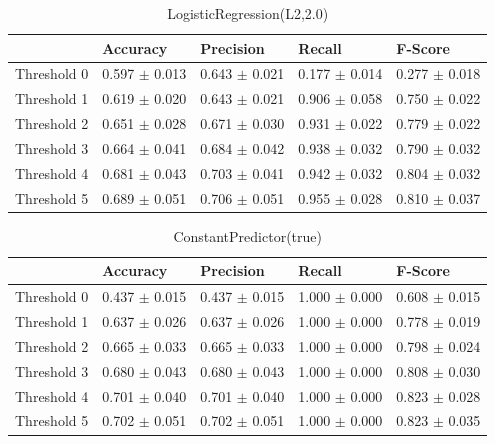 \begin{table}[h]
	\centering
	\begin{tabular}{|l|l|l|l|l|} %
	\hline
	& Accuracy & Precision & Recall & F-Score \\ \hline
	Threshold 0 & 0.597	\( \pm \) 0.013	& 0.643	\( \pm \) 0.021	& 0.177	\( \pm \) 0.014	& 0.277	\( \pm \) 0.018	\\ \hline
	Threshold 1 & 0.619	\( \pm \) 0.020	& 0.643	\( \pm \) 0.021	& 0.906	\( \pm \) 0.058	& 0.750	\( \pm \) 0.022	\\ \hline
	Threshold 2 & 0.651	\( \pm \) 0.028	& 0.671	\( \pm \) 0.030	& 0.931	\( \pm \) 0.022	& 0.779	\( \pm \) 0.022	\\ \hline
	Threshold 3 & 0.664	\( \pm \) 0.041	& 0.684	\( \pm \) 0.042	& 0.938	\( \pm \) 0.032	& 0.790	\( \pm \) 0.032	\\ \hline
	Threshold 4 & 0.681	\( \pm \) 0.043	& 0.703	\( \pm \) 0.041	& 0.942	\( \pm \) 0.032	& 0.804	\( \pm \) 0.032	\\ \hline
	Threshold 5 & 0.689	\( \pm \) 0.051	& 0.706	\( \pm \) 0.051	& 0.955	\( \pm \) 0.028	& 0.810	\( \pm \) 0.037	\\ \hline
	\end{tabular}
	\caption{LogisticRegression(L2,2.0)}
	\label{tab:revpol}
\end{table}
\clearpage
\begin{table}[h]
	\centering
	\begin{tabular}{|l|l|l|l|l|} %
	\hline
	& Accuracy & Precision & Recall & F-Score \\ \hline
	Threshold 0 & 0.437	\( \pm \) 0.015	& 0.437	\( \pm \) 0.015	& 1.000	\( \pm \) 0.000	& 0.608	\( \pm \) 0.015	\\ \hline
	Threshold 1 & 0.637	\( \pm \) 0.026	& 0.637	\( \pm \) 0.026	& 1.000	\( \pm \) 0.000	& 0.778	\( \pm \) 0.019	\\ \hline
	Threshold 2 & 0.665	\( \pm \) 0.033	& 0.665	\( \pm \) 0.033	& 1.000	\( \pm \) 0.000	& 0.798	\( \pm \) 0.024	\\ \hline
	Threshold 3 & 0.680	\( \pm \) 0.043	& 0.680	\( \pm \) 0.043	& 1.000	\( \pm \) 0.000	& 0.808	\( \pm \) 0.030	\\ \hline
	Threshold 4 & 0.701	\( \pm \) 0.040	& 0.701	\( \pm \) 0.040	& 1.000	\( \pm \) 0.000	& 0.823	\( \pm \) 0.028	\\ \hline
	Threshold 5 & 0.702	\( \pm \) 0.051	& 0.702	\( \pm \) 0.051	& 1.000	\( \pm \) 0.000	& 0.823	\( \pm \) 0.035	\\ \hline
	\end{tabular}
	\caption{ConstantPredictor(true)}
	\label{tab:revpol}
\end{table}
